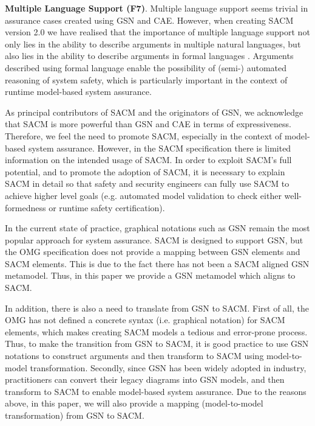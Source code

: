 \textbf{Multiple Language Support (F7)}. Multiple language support seems trivial in assurance cases created using GSN and CAE.
However, when creating SACM version 2.0 we have realised that the importance of multiple language support not only lies in the ability to describe arguments in multiple natural languages, but also lies in the ability to describe arguments in formal languages \cite{denney2013formal}.
Arguments described using formal language enable the possibility of (semi-) automated reasoning of system safety, which is particularly important in the context of runtime model-based system assurance.

As principal contributors of SACM and the originators of GSN, we acknowledge that SACM is more powerful than GSN and CAE in terms of expressiveness.
Therefore, we feel the need to promote SACM, especially in the context of model-based system assurance.
However, in the SACM specification there is limited information on the intended usage of SACM. 
In order to exploit SACM's full potential, and to promote the adoption of SACM, it is necessary to explain SACM in detail so that safety and security engineers can fully use SACM to achieve higher level goals (e.g. automated model validation to check either well-formedness or runtime safety certification). 

In the current state of practice, graphical notations such as GSN remain the most popular approach for system assurance. 
SACM is designed to support GSN, but the OMG specification does not provide a mapping between GSN elements and SACM elements. 
This is due to the fact there has not been a SACM aligned GSN metamodel. 
Thus, in this paper we provide a GSN metamodel which aligns to SACM. 

In addition, there is also a need to translate from GSN to SACM. 
First of all, the OMG has not defined a concrete syntax (i.e. graphical notation) for SACM elements, which makes creating SACM models a tedious and error-prone process. 
Thus, to make the transition from GSN to SACM, it is good practice to use GSN notations to construct arguments and then transform to SACM using model-to-model transformation. 
Secondly, since GSN has been widely adopted in industry, practitioners can convert their legacy diagrams into GSN models, and then transform to SACM to enable model-based system assurance. 
Due to the reasons above, in this paper, we will also provide a mapping (model-to-model transformation) from GSN to SACM.

